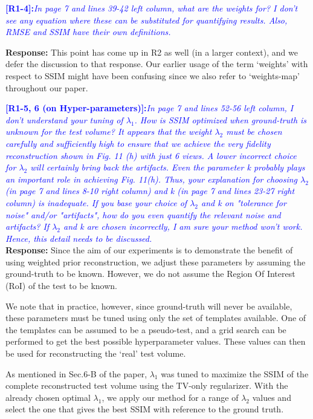 \documentclass{article}
\begin{document}
  \textcolor{blue}{\textbf{[R1-4]:}\textit{In page 7 and lines 39-42
      left column, what are the weights for? I don't see any equation
      where these can be substituted for quantifying results. Also,
      RMSE and SSIM have their own definitions.}}

  \textbf{Response:} This point has come up in R2 as well (in a larger
  context), and we defer the discussion to that response.  Our earlier
  usage of the term `weights' with respect to SSIM might have been
  confusing since we also refer to `weights-map' throughout our paper.
  


\textcolor{blue}{\textbf{[R1-5, 6 (on Hyper-parameters)]:}\textit{In page 7 and lines 52-56 left column, I don't understand your tuning of $\lambda_1$. How is SSIM optimized when ground-truth is unknown for the test volume?
    It appears that the weight $\lambda_2$ must be chosen carefully and sufficiently high to ensure that we achieve the very fidelity reconstruction shown in Fig. 11 (h) with just 6 views. A lower incorrect choice for $\lambda_2$ will certainly bring back the artifacts. Even the parameter k probably plays an important role in achieving Fig. 11(h). Thus, your explanation for choosing $\lambda_2$ (in page 7 and lines 8-10 right column) and k (in page 7 and lines 23-27 right column) is inadequate. If you base your choice of $\lambda_2$ and k on "tolerance for noise" and/or "artifacts", how do you even quantify the relevant noise and artifacts? If $\lambda_2$ and k are chosen incorrectly, I am sure your method won't work. Hence, this detail needs to be discussed.}}\\

\textbf{Response:} Since the aim of our experiments is to demonstrate the benefit of using weighted prior reconstruction, we adjust these parameters by assuming the ground-truth to be known. However, we do not assume the Region Of Interest (RoI) of the test to be known.

We note that in practice, however, since ground-truth will never be
available, these parameters must be tuned using only the set of
templates available.  One of the templates can be assumed to be a
pseudo-test, and a grid search can be performed to get the best
possible hyperparameter values. These values can then be used for
reconstructing the `real' test volume.

As mentioned in Sec.6-B of the paper, $\lambda_1$ was tuned to maximize the SSIM of the complete reconstructed test volume using the TV-only regularizer. With the already chosen optimal $\lambda_1$, we apply our method for a range of $\lambda_2$ values and select the one that gives the best SSIM with reference to the ground truth.
\end{document}
